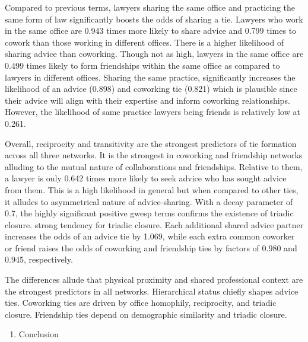 \documentclass[
]{article}
\providecommand{\tightlist}{%
  \setlength{\itemsep}{0pt}\setlength{\parskip}{0pt}}
\begin{document}
Compared to previous terms, lawyers sharing the same office and
practicing the same form of law significantly boosts the odds of sharing
a tie. Lawyers who work in the same office are 0.943 times more likely
to share advice and 0.799 times to cowork than those working in
different offices. There is a higher likelihood of sharing advice than
coworking. Though not as high, lawyers in the same office are 0.499
times likely to form friendships within the same office as compared to
lawyers in different offices. Sharing the same practice, significantly
increases the likelihood of an advice (0.898) and coworking tie (0.821)
which is plausible since their advice will align with their expertise
and inform coworking relationships. However, the likelihood of same
practice lawyers being friends is relatively low at 0.261.

Overall, reciprocity and transitivity are the strongest predictors of
tie formation across all three networks. It is the strongest in
coworking and friendship networks alluding to the mutual nature of
collaborations and friendships. Relative to them, a lawyer is only 0.642
times more likely to seek advice who has sought advice from them. This
is a high likelihood in general but when compared to other ties, it
alludes to asymmetrical nature of advice-sharing. With a decay parameter
of 0.7, the highly significant positive gwesp terms confirms the
existence of triadic closure. strong tendency for triadic closure. Each
additional shared advice partner increases the odds of an advice tie by
1.069, while each extra common coworker or friend raises the odds of
coworking and friendship ties by factors of 0.980 and 0.945,
respectively.

The differences allude that physical proximity and shared professional
context are the strongest predictors in all networks. Hierarchical
status chiefly shapes advice ties. Coworking ties are driven by office
homophily, reciprocity, and triadic closure. Friendship ties depend on
demographic similarity and triadic closure.

\begin{enumerate}
\def\labelenumi{\arabic{enumi}.}
\setcounter{enumi}{4}
\tightlist
\item
  Conclusion
\end{enumerate}
\end{document}
